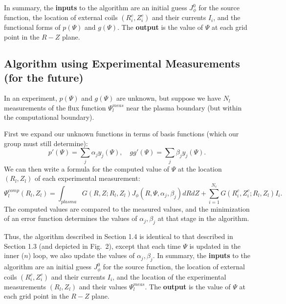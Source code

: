 \documentclass[paper=letter, fontsize=11pt]{scrartcl} %
\begin{document}
In summary, the \textbf{inputs} to the algorithm are an initial guess $J_\phi^0$ for the source function, the location of external coils $(R_i^c,Z_i^c)$ and their currents $I_i$, and the functional forms of $p(\Psi)$ and $g(\Psi)$.  The \textbf{output} is the value of $\Psi$ at each grid point in the $R-Z$ plane.  

\subsection{Algorithm using Experimental Measurements (for the future)}

In an experiment, $p(\Psi)$ and $g(\Psi)$ are unknown, but suppose we have $N_l$ measurements of the flux function $\Psi_l^{meas}$ near the plasma boundary (but within the computational boundary).  

First we expand our unknown functions in terms of basis functions (which our group must still determine):
\begin{equation}
p'(\Psi) = \sum_j \alpha_j y_j(\Psi), \quad gg'(\Psi) = \sum_j \beta_j y_j(\Psi).
\end{equation}
We can then write a formula for the computed value of $\Psi$ at the location $(R_l, Z_l)$ of each experimental measurement: 
\begin{equation}
\Psi_l^{comp}(R_l, Z_l) = \int_{plasma} G(R,Z; R_l,Z_l) J_\phi(R,\Psi,\alpha_j,\beta_j) dR dZ + \sum_{i=1}^{N_c} G(R_i^c,Z_i^c; R_l,Z_l) I_i.
\end{equation}
The computed values are compared to the measured values, and the minimization of an error function determines the values of $\alpha_j, \beta_j$ at that stage in the algorithm.   

Thus, the algorithm described in Section 1.4 is identical to that described in Section 1.3 (and depicted in Fig.~2), except that each time $\Psi$ is updated in the inner ($n$) loop, we also update the values of $\alpha_j, \beta_j$.  In summary, the \textbf{inputs} to the algorithm are an initial guess $J_\phi^0$ for the source function, the location of external coils $(R_i^c,Z_i^c)$ and their currents $I_i$, and the location of the experimental measurements $(R_l,Z_l)$ and their values $\Psi_l^{meas}$.  The \textbf{output} is the value of $\Psi$ at each grid point in the $R-Z$ plane.  



\end{document}

